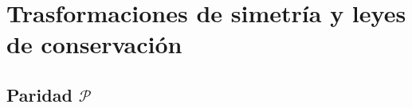 \chapter{Trasformaciones de simetría y leyes de conservación}



\section{Paridad $\mathcal{P}$} \label{Sec:07-09}